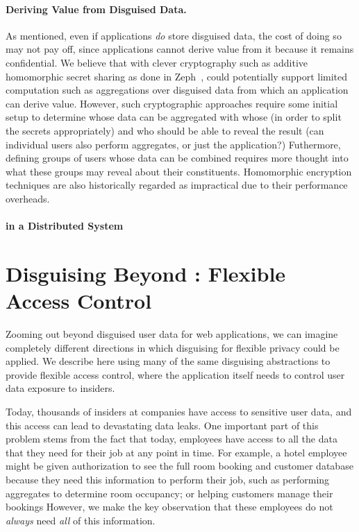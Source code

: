 \paragraph{Deriving Value from Disguised Data.}
As mentioned, even if applications \emph{do} store disguised data, the cost of
doing so may not pay off, since applications cannot derive value from it because
it remains confidential. 
%
We believe that with clever cryptography such as additive homomorphic secret
sharing as done in Zeph~\cite{zeph}, \sys could potentially support limited
computation such as aggregations over disguised data from which an application
can derive value.
%
However, such cryptographic approaches require some initial setup to determine
whose data can be aggregated with whose (in order to split the secrets
appropriately) and who should be able to reveal the result (can individual users
also perform aggregates, or just the application?) Futhermore, defining groups
of users whose data can be combined requires more thought into what these groups
may reveal about their constituents.
%
Homomorphic encryption techniques are also historically regarded as impractical
due to their performance overheads.


\paragraph{\sys in a Distributed System}

\section{Disguising Beyond \sys: Flexible Access Control}

Zooming out beyond disguised user data for web applications, we can imagine
completely different directions in which disguising for flexible privacy could
be applied. We describe here using many of the same disguising abstractions to
provide flexible access control, where the application itself needs to control
user data exposure to insiders.

Today, thousands of insiders at companies have access to sensitive user data,
and this access can lead to devastating data leaks.
%
One important part of this problem stems from the fact that today, employees
have access to all the data that they need for their job at any point in time.
For example, a hotel employee might be given authorization to see the full room
booking and customer database because they need this information to perform
their job, such as performing aggregates to determine room occupancy; or helping
customers manage their bookings
%
However, we make the key observation that these employees do not \emph{always} need
\emph{all} of this information.

